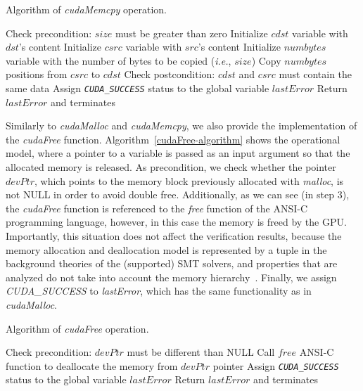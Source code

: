 \documentclass[times, doublespace]{cpeauth}
\begin{document}
\begin{algorithm}
\caption{Algorithm of \textit{cudaMemcpy} operation.}
\label{cudaMemcpy-algorithm}
\begin{algorithmic}[1]
  \State Check precondition: $size$ must be greater than zero
  \State Initialize $cdst$ variable with $dst$'s content
  \State Initialize $csrc$ variable with $src$'s content
  \State Initialize $numbytes$ variable with the number of bytes to be copied (\textit{i.e.}, $size$)
  \State Copy $numbytes$ positions from $csrc$ to $cdst$
	\State Check postcondition: $cdst$ and $csrc$ must contain the same data
  \State Assign \emph{\tt CUDA\_SUCCESS} status to the global variable $lastError$
  \State Return $lastError$ and terminates
  \EndFunction
\end{algorithmic}
\end{algorithm}

Similarly to \textit{cudaMalloc} and \textit{cudaMemcpy}, we also provide the implementation of the \textit{cudaFree} function. Algorithm~\ref{cudaFree-algorithm} shows the operational model, where a pointer to a variable is passed as an input argument so that the allocated memory is released. As precondition, we check whether the pointer $devPtr$, which points to the memory block previously allocated with \textit{malloc}, is not NULL in order to avoid double free. Additionally, as we can see (in step $3$), the \textit{cudaFree} function is referenced to the \textit{free} function of the ANSI-C programming language, however, in this case the memory is freed by the GPU. Importantly, this situation does not affect the verification results, because the memory allocation and deallocation model is represented by a tuple in the background theories of the (supported) SMT solvers, and properties that are analyzed do not take into account the memory hierarchy~\cite{tacas14}. Finally, we assign \textit{CUDA\_SUCCESS} to \textit{lastError}, which has the same functionality as in \textit{cudaMalloc}.

\begin{algorithm}
\caption{Algorithm of \textit{cudaFree} operation.}
\label{cudaFree-algorithm}
\begin{algorithmic}[1]
	\State Check precondition: $devPtr$ must be different than NULL
  \State Call $free$ ANSI-C function to deallocate the memory from $devPtr$ pointer
  \State Assign \emph{\tt CUDA\_SUCCESS} status to the global variable $lastError$
  \State Return $lastError$ and terminates
  \EndProcedure
\end{algorithmic}
\end{algorithm}
\end{document}
